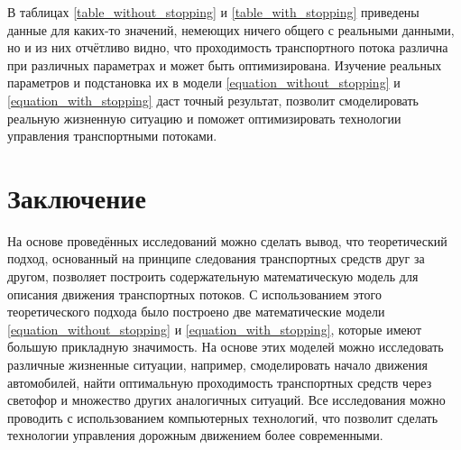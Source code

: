 \documentclass[12pt, a4paper]{extarticle}
\numberwithin{equation}{section}
\begin{document}
В таблицах \eqref{table_without_stopping} и \eqref{table_with_stopping} приведены данные для каких-то значений, немеющих ничего общего с реальными данными, но и из них отчётливо видно, что проходимость транспортного потока различна при различных параметрах и может быть оптимизирована. Изучение реальных параметров и подстановка их в модели \eqref{equation_without_stopping} и \eqref{equation_with_stopping} даст точный результат, позволит смоделировать реальную жизненную ситуацию и поможет оптимизировать технологии управления транспортными потоками.

\vspace{\baselineskip} \vspace{\baselineskip} \vspace{\baselineskip} 
\vspace{\baselineskip} \vspace{\baselineskip} \vspace{\baselineskip}
\hspace{0pt}

\newpage
\section*{Заключение}
На основе проведённых исследований можно сделать вывод, что теоретический подход, основанный на принципе следования транспортных средств друг за другом, позволяет построить содержательную математическую модель для описания движения транспортных потоков. С использованием этого теоретического подхода было построено две математические модели  \eqref{equation_without_stopping} и \eqref{equation_with_stopping}, которые имеют большую прикладную значимость. На основе этих моделей можно исследовать различные жизненные ситуации, например, смоделировать начало движения автомобилей, найти оптимальную проходимость транспортных средств через светофор и множество других аналогичных ситуаций. Все исследования можно проводить с использованием компьютерных технологий, что позволит сделать технологии управления дорожным движением более современными.

\newpage
\end{document}
